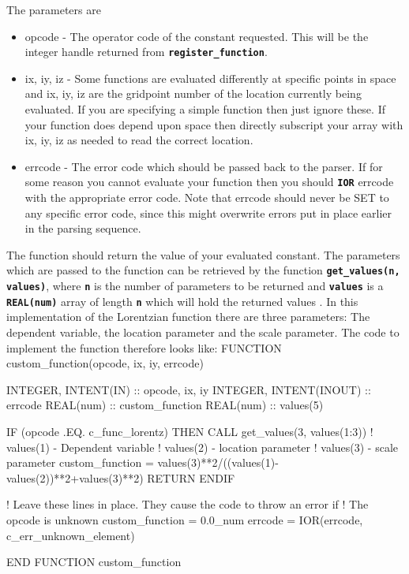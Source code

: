\documentclass[12pt,a4paper]{article}
\newcommand{\inlinecode}[1]{{\color{warwickred} \bf\texttt{#1}}}
\newenvironment{boxverbatim}{\lboxverbatim{none}}{\endlboxverbatim}
\begin{document}
The parameters are

\begin{itemize}
\item opcode - The operator code of the constant requested. This will be the
  integer handle returned from \inlinecode {register\_function}.
\item ix, iy, iz - Some functions are evaluated differently at specific points
  in space and ix, iy, iz are the gridpoint number of the location currently
  being evaluated. If you are specifying a simple function then just
  ignore these. If your function does depend upon space then directly
  subscript your array with ix, iy, iz as needed to read the correct location.
\item errcode - The error code which should be passed back to the
  parser. If for some reason you cannot evaluate your function then you should
  \inlinecode{IOR} errcode with the appropriate error code. Note that errcode
  should never be SET to any specific error code, since this might overwrite
  errors put in place earlier in the parsing sequence.
\end{itemize}

The function should return the value of your evaluated constant. The
parameters which are passed to the function can be retrieved by the function
\inlinecode {get\_values(n, values)}, where \inlinecode {n} is the number of
parameters to be returned and \inlinecode{values} is a \inlinecode{REAL(num)}
array of length \inlinecode{n} which will hold the returned values .  In this
implementation of the Lorentzian function there are three parameters: The
dependent variable, the location parameter and the scale parameter. The code
to implement the function therefore looks like:
\begin{boxverbatim}
FUNCTION custom_function(opcode, ix, iy, errcode)

  INTEGER, INTENT(IN) :: opcode, ix, iy
  INTEGER, INTENT(INOUT) :: errcode
  REAL(num) :: custom_function
  REAL(num) :: values(5)

  IF (opcode .EQ. c_func_lorentz) THEN
    CALL get_values(3, values(1:3))
    ! values(1) - Dependent variable
    ! values(2) - location parameter
    ! values(3) - scale parameter
    custom_function = values(3)**2/((values(1)-values(2))**2+values(3)**2)
    RETURN
  ENDIF

  ! Leave these lines in place. They cause the code to throw an error if
  ! The opcode is unknown
  custom_function = 0.0_num
  errcode = IOR(errcode, c_err_unknown_element)

END FUNCTION custom_function
\end{boxverbatim}
\end{document}
